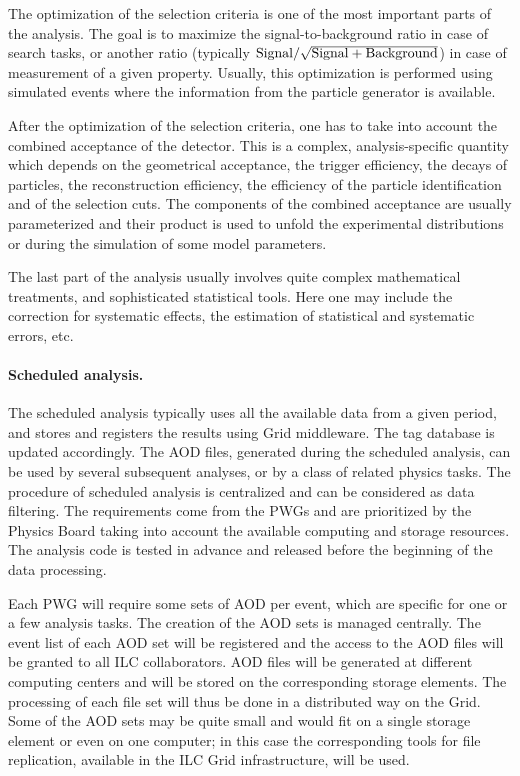 \documentclass[12pt,a4paper,twoside]{article}
\makeatletter
\newcommand {\grid} {Grid\@\xspace}
\makeatother
\begin{document}
{The optimization of the selection criteria is one of the most
important parts of the analysis. The goal is to maximize the
signal-to-background ratio in case of search tasks, or another 
ratio (typically ${\rm Signal/\sqrt{Signal+Background}}$) in
case of measurement of a given property.  Usually, this optimization is
performed using simulated events where the information from the
particle generator is available. 

After the optimization of the selection criteria, one has to take into
account the combined acceptance of the detector.  This is a complex,
analysis-specific quantity which depends on the geometrical acceptance,
the trigger efficiency, the decays of particles, the reconstruction
efficiency, the efficiency of the particle identification and of the
selection cuts. The components of the combined acceptance are usually
parameterized and their product is used to unfold the experimental
distributions or during the simulation of some model parameters. 

The last part of the analysis usually involves quite complex
mathematical treatments, and sophisticated statistical tools. Here one
may include the correction for systematic effects, the estimation of
statistical and systematic errors, etc.

\noindent
\paragraph{Scheduled analysis.}
\noindent
The scheduled analysis typically uses all
the available data from a given period, and stores and registers the results
using \grid middleware. The tag database is updated accordingly. The
AOD files, generated during the scheduled 
analysis, can be used by several subsequent analyses, or by a class of
related physics tasks. 
The procedure of scheduled analysis is centralized and can be
considered as data filtering. The requirements come from the PWGs and
are prioritized by the Physics Board taking into 
account the available computing and storage resources. The analysis
code is tested in advance and released before the beginning of the
data processing.

Each PWG will require some sets of
AOD per event, which are specific for one or
a few analysis tasks. The creation of the AOD sets is managed centrally.
The event list of each AOD set
will be registered and the access to the AOD files will be granted to
all ILC collaborators.  AOD files will be generated 
at different computing centers and will be stored on
the corresponding storage 
elements.  The processing of each file set will thus be done in a
distributed way on the \grid. Some of the AOD sets may be quite small
and would fit on a single storage element or even on one computer; in
this case the corresponding tools for file replication, available
in the ILC \grid infrastructure, will be used.

}
\end{document}
